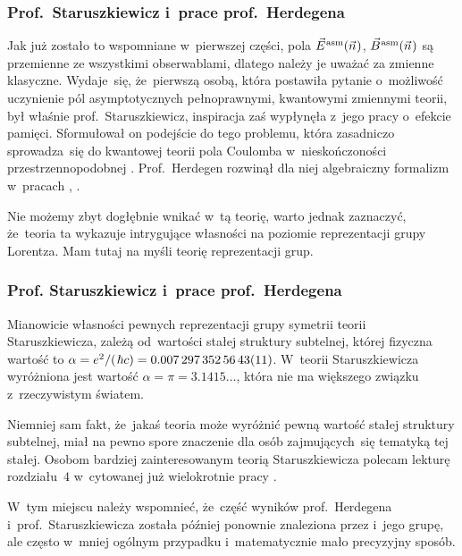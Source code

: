 \documentclass[10pt,t]{beamer}
\begin{document}
\begin{frame}
  \frametitle{Prof.~Staruszkiewicz i~prace prof.~Herdegena}


  Jak już zostało to wspomniane w~pierwszej części, pola $\vec{E}^{ \hspace{0.05em} \text{asm} }( \vec{n} \hspace{0.05em} )$,
  $\vec{B}^{ \hspace{0.05em} \text{asm} }( \vec{n} \hspace{0.05em} )$ są przemienne ze wszystkimi obserwablami, dlatego należy
  je uważać za zmienne klasyczne. Wydaje~się, że~pierwszą osobą, która
  postawiła pytanie o~możliwość uczynienie pól asymptotycznych
  pełnoprawnymi, kwantowymi zmiennymi teorii, był właśnie
  prof.~Staruszkiewicz, inspiracja zaś wypłynęła z~jego pracy o~efekcie
  pamięci. Sformułował on podejście do tego problemu, która zasadniczo
  sprowadza~się do kwantowej teorii pola Coulomba w~nieskończoności
  przestrzennopodobnej
  \parencite{Staruszkiewicz-Quantum-Mechanics-of-Phase-and-Charge-ETC-Pub-1989}.
  Prof.~Herdegen rozwinął dla niej algebraiczny formalizm w~pracach
  \parencite{Herdegen-Asymptotic-algebra-of-quantum-electrodynamics-Pub-2005},
  \parencite{Herdegen-Remarks-on-mathematical-structure-of-ETC-Pub-2022}.

  Nie możemy zbyt dogłębnie wnikać w~tą teorię, warto jednak zaznaczyć,
  że~teoria ta wykazuje intrygujące własności na poziomie reprezentacji
  grupy Lorentza. Mam tutaj na myśli teorię reprezentacji grup.

\end{frame}





\begin{frame}
  \frametitle{Prof. Staruszkiewicz i~prace prof.~Herdegena}


  Mianowicie własności pewnych reprezentacji grupy symetrii teorii
  Staruszkiewicza, zależą od~wartości stałej struktury subtelnej, której
  fizyczna wartość to
  $\alpha = e^{ 2 } / ( \hspace{0.09em} \hbar c ) = 0.007 \, 297 \, 352 \, 56 \,
  43(11)$. W~teorii Staruszkiewicza
  wyróżniona jest wartość $\alpha = \pi = 3.1415\ldots$, która nie ma większego związku
  z~rzeczywistym światem.

  Niemniej sam fakt, że~jakaś teoria może wyróżnić
  pewną wartość stałej struktury subtelnej, miał na pewno spore
  znaczenie dla osób zajmujących~się tematyką tej stałej.
  Osobom bardziej zainteresowanym teorią Staruszkiewicza polecam lekturę
  rozdziału~$4$ w~cytowanej już wielokrotnie pracy
  \parencite{Herdegen-Infrared-structure-beyond-locality-ETC-Ver-2024}.

  W~tym miejscu należy wspomnieć, że~część wyników prof.~Herdegena
  i~prof.~Staruszkiewicza została później ponownie znaleziona przez
   i~jego grupę, ale często w~mniej ogólnym przypadku
  i~matematycznie mało precyzyjny sposób.

\end{frame}
\end{document}
